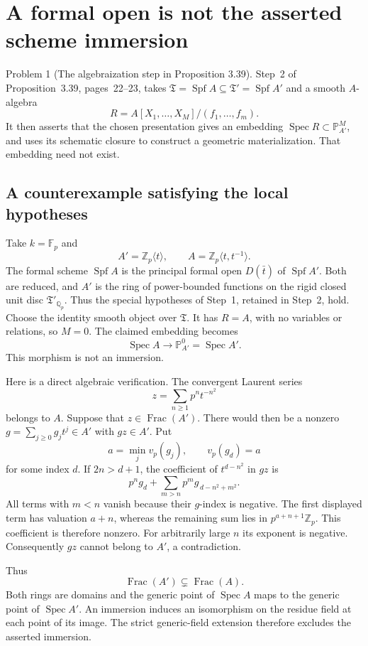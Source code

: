 \documentclass[10pt]{article}
\begin{document}
\section*{A formal open is not the asserted scheme immersion}
Problem 1 (The algebraization step in Proposition 3.39).  Step 2 of Proposition 3.39, pages 22–23, takes \(\mathfrak T=\operatorname{Spf}A\subseteq\mathfrak T'=\operatorname{Spf}A'\) and a smooth \(A\)-algebra \[R=A[X_1,\ldots,X_M]/(f_1,\ldots,f_m).\] It then asserts that the chosen presentation gives an embedding \(\operatorname{Spec}R\subset\mathbb P^M_{A'}\), and uses its schematic closure to construct a geometric materialization. That embedding need not exist.\par
\subsection*{A counterexample satisfying the local hypotheses}
Take \(k=\mathbb F_p\) and \[A'=\mathbb Z_p\langle t\rangle,\qquad
 A=\mathbb Z_p\langle t,t^{-1}\rangle.\] The formal scheme \(\operatorname{Spf}A\) is the principal formal open \(D(\bar t)\) of \(\operatorname{Spf}A'\). Both are reduced, and \(A'\) is the ring of power-bounded functions on the rigid closed unit disc \(\mathfrak T'_{\mathbb Q_p}\). Thus the special hypotheses of Step 1, retained in Step 2, hold. Choose the identity smooth object over \(\mathfrak T\). It has \(R=A\), with no variables or relations, so \(M=0\). The claimed embedding becomes \[\operatorname{Spec}A\longrightarrow\mathbb P^0_{A'}=\operatorname{Spec}A'.\] This morphism is not an immersion.\par
Here is a direct algebraic verification. The convergent Laurent series \[z=\sum_{n\geq1}p^n t^{-n^2}\] belongs to \(A\). Suppose that \(z\in\operatorname{Frac}(A')\). There would then be a nonzero \(g=\sum_{j\geq0}g_jt^j\in A'\) with \(gz\in A'\). Put \[a=\min_j v_p(g_j),\qquad v_p(g_d)=a\] for some index \(d\). If \(2n>d+1\), the coefficient of \(t^{d-n^2}\) in \(gz\) is \[p^n g_d+\sum_{m>n}p^m g_{\,d-n^2+m^2}.\] All terms with \(m<n\) vanish because their \(g\)-index is negative. The first displayed term has valuation \(a+n\), whereas the remaining sum lies in \(p^{a+n+1}\mathbb Z_p\). This coefficient is therefore nonzero. For arbitrarily large \(n\) its exponent is negative. Consequently \(gz\) cannot belong to \(A'\), a contradiction.\par
Thus \[\operatorname{Frac}(A')\subsetneq\operatorname{Frac}(A).\] Both rings are domains and the generic point of \(\operatorname{Spec}A\) maps to the generic point of \(\operatorname{Spec}A'\). An immersion induces an isomorphism on the residue field at each point of its image. The strict generic-field extension therefore excludes the asserted immersion.\par
\end{document}
